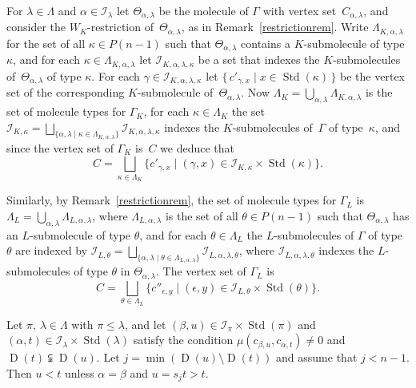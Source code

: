 \documentclass[ALCO,ThmDefs,Unicode,epreuves]{cedram}
\DeclareMathOperator{\STD}{Std}
\DeclareMathOperator{\D}{D}
\begin{document}
For $\lambda\in\Lambda$ and $\alpha\in\mathcal{I}_\lambda$ let $\Theta_{\alpha,\lambda}$
be the molecule of $\Gamma$ with vertex set~$C_{\alpha,\lambda}$, and consider
the $W_K$-restriction of~$\Theta_{\alpha,\lambda}$, as in Remark~\ref{restrictionrem}.
Write $\Lambda_{K,\alpha,\lambda}$ for the set of all $\kappa\in P(n-1)$
such that $\Theta_{\alpha,\lambda}$ contains a $K$-submolecule of type $\kappa$,
and for each $\kappa\in\Lambda_{K,\alpha,\lambda}$ let $\mathcal{I}_{K,\alpha,\lambda,\kappa}$
be a set that indexes the $K$-submolecules of~$\Theta_{\alpha,\lambda}$ of type $\kappa$.
For each $\gamma\in\mathcal{I}_{K,\alpha,\lambda,\kappa}$ let
$\{\,c'_{\gamma,x}\mid x\in\STD(\kappa)\,\}$ be the vertex set of the corresponding
$K$-submolecule of~$\Theta_{\alpha,\lambda}$. Now
$\Lambda_K=\bigcup_{\alpha,\lambda}\Lambda_{K,\alpha,\lambda}$ is the set of molecule
types for $\Gamma_K$, for each $\kappa\in\Lambda_K$ the set
$\mathcal{I}_{K,\kappa}=\bigsqcup_{\{\alpha,\lambda\mid \kappa\in\Lambda_{K,\alpha,\lambda}\}}\mathcal{I}_{K,\alpha,\lambda,\kappa}$
indexes the $K$-submolecules of~$\Gamma$ of type~$\kappa$, and since the vertex set of
$\Gamma_K$ is~$C$ we deduce that
\begin{equation}\label{verticesofGammaK}
C = \bigsqcup_{\kappa\in\Lambda_K}\{c'_{\gamma,x}\mid (\gamma,x)\in\mathcal{I}_{K,\kappa}\times\STD(\kappa)\}.
\end{equation}

Similarly, by Remark~\ref{restrictionrem}, the set of molecule types for $\Gamma_L$ is
$\Lambda_L=\bigcup_{\alpha,\lambda}\Lambda_{L,\alpha,\lambda}$,
where $\Lambda_{L,\alpha,\lambda}$ is the set of all $\theta\in P(n-1)$
such that $\Theta_{\alpha,\lambda}$ has an $L$-submolecule of type $\theta$, and
for each $\theta\in\Lambda_L$ the $L$-submolecules of $\Gamma$ of type $\theta$
are indexed by
$\mathcal{I}_{L,\theta}=\bigsqcup_{\{\alpha,\lambda\mid \theta\in\Lambda_{L,\alpha,\lambda}\}}
\mathcal{I}_{L,\alpha,\lambda,\theta}$, where $\mathcal{I}_{L,\alpha,\lambda,\theta}$
indexes the $L$-submolecules of type $\theta$ in $\Theta_{\alpha,\lambda}$. The vertex
set of $\Gamma_L$ is
\begin{equation}\label{verticesofGammaL}
C = \bigsqcup_{\theta\in\Lambda_L}\{c''_{\epsilon,y}\mid (\epsilon,y)\in\mathcal{I}_{L,\theta}\times\STD(\theta)\}.
\end{equation}

\begin{lemm}\label{kldominancesamenolecule0}
Let $\pi,\,\lambda\in\Lambda$ with $\pi\leqslant\lambda$, and
let $(\beta,u)\in\mathcal{I}_{\pi}\times\STD(\pi)$ and
$(\alpha,t)\in\mathcal{I}_{\lambda}\times\STD(\lambda)$ satisfy the condition
$\mu(c_{\beta,u},c_{\alpha,t}) \neq 0$ and $\D(t) \subsetneqq \D(u)$.
Let $j=\min(\D(u)\setminus\D(t))$ and assume that $j<n-1$. Then $u < t$ unless
$\alpha = \beta$ and $u=s_j t>t$.
\end{lemm}
\end{document}
